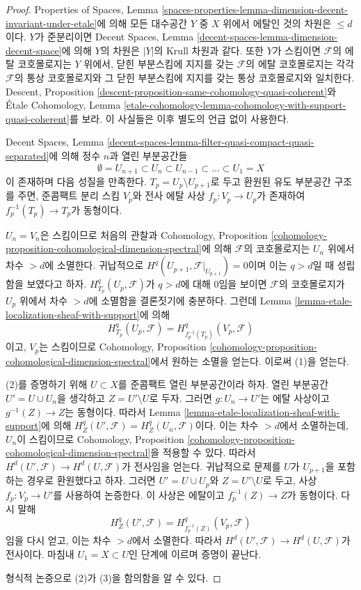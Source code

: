 \begin{proof}
Properties of Spaces, Lemma
\ref{spaces-properties-lemma-dimension-decent-invariant-under-etale}에 의해
모든 대수공간 $Y$ 중 $X$ 위에서 에탈인 것의 차원은 $\leq d$이다.
$Y$가 준분리이면 Decent Spaces, Lemma
\ref{decent-spaces-lemma-dimension-decent-space}에 의해 $Y$의 차원은
$|Y|$의 Krull 차원과 같다. 또한 $Y$가 스킴이면
$\mathcal{F}$의 에탈 코호몰로지는 $Y$ 위에서, 닫힌 부분스킴에
지지를 갖는 $\mathcal{F}$의 에탈 코호몰로지는 각각
$\mathcal{F}$의 통상 코호몰로지와 그 닫힌 부분스킴에 지지를 갖는
통상 코호몰로지와 일치한다. Descent, Proposition
\ref{descent-proposition-same-cohomology-quasi-coherent}와
\'Etale Cohomology, Lemma
\ref{etale-cohomology-lemma-cohomology-with-support-quasi-coherent}를 보라.
이 사실들은 이후 별도의 언급 없이 사용한다.

\medskip\noindent
Decent Spaces, Lemma
\ref{decent-spaces-lemma-filter-quasi-compact-quasi-separated}에 의해
정수 $n$과 열린 부분공간들
$$
\emptyset = U_{n + 1} \subset
U_n \subset U_{n - 1} \subset \ldots \subset U_1 = X
$$
이 존재하며 다음 성질을 만족한다. $T_p = U_p \setminus U_{p + 1}$로
두고 환원된 유도 부분공간 구조를 주면, 준콤팩트 분리 스킴 $V_p$와
전사 에탈 사상 $f_p : V_p \to U_p$가 존재하여
$f_p^{-1}(T_p) \to T_p$가 동형이다.

\medskip\noindent
$U_n = V_n$은 스킴이므로 처음의 관찰과 Cohomology, Proposition
\ref{cohomology-proposition-cohomological-dimension-spectral}에 의해
$\mathcal{F}$의 코호몰로지는 $U_n$ 위에서 차수 $> d$에 소멸한다.
귀납적으로 $H^q(U_{p + 1}, \mathcal{F}|_{U_{p + 1}}) = 0$이며
이는 $q > d$일 때 성립함을 보였다고 하자.
$H_{T_p}^q(U_p, \mathcal{F})$가 $q > d$에 대해 0임을 보이면
$\mathcal{F}$의 코호몰로지가 $U_p$ 위에서 차수 $> d$에 소멸함을
결론짓기에 충분하다. 그런데 Lemma
\ref{lemma-etale-localization-sheaf-with-support}에 의해
$$
H^q_{T_p}(U_p, \mathcal{F}) = H^q_{f_p^{-1}(T_p)}(V_p, \mathcal{F})
$$
이고, $V_p$는 스킴이므로 Cohomology, Proposition
\ref{cohomology-proposition-cohomological-dimension-spectral}에서 원하는
소멸을 얻는다. 이로써 (1)을 얻는다.

\medskip\noindent
(2)를 증명하기 위해 $U \subset X$를 준콤팩트 열린 부분공간이라 하자.
열린 부분공간 $U' = U \cup U_n$을 생각하고 $Z = U' \setminus U$로
두자. 그러면 $g : U_n \to U'$는 에탈 사상이고
$g^{-1}(Z) \to Z$는 동형이다. 따라서 Lemma
\ref{lemma-etale-localization-sheaf-with-support}에 의해
$H^q_Z(U', \mathcal{F}) = H^q_Z(U_n, \mathcal{F})$이다. 이는
차수 $> d$에서 소멸하는데, $U_n$이 스킴이므로 Cohomology, Proposition
\ref{cohomology-proposition-cohomological-dimension-spectral}을 적용할 수
있다. 따라서 $H^d(U', \mathcal{F}) \to H^d(U, \mathcal{F})$가
전사임을 얻는다. 귀납적으로 문제를 $U$가 $U_{p + 1}$을 포함하는
경우로 환원했다고 하자. 그러면 $U' = U \cup U_p$와
$Z = U' \setminus U$로 두고, 사상 $f_p : V_p \to U'$를 사용하여
논증한다. 이 사상은 에탈이고 $f_p^{-1}(Z) \to Z$가 동형이다.
다시 말해
$$
H^q_Z(U', \mathcal{F}) = H^q_{f_p^{-1}(Z)}(V_p, \mathcal{F})
$$
임을 다시 얻고, 이는 차수 $> d$에서 소멸한다. 따라서
$H^d(U', \mathcal{F}) \to H^d(U, \mathcal{F})$가 전사이다.
마침내 $U_1 = X \subset U$인 단계에 이르며 증명이 끝난다.

\medskip\noindent
형식적 논증으로 (2)가 (3)을 함의함을 알 수 있다.
\end{proof}
